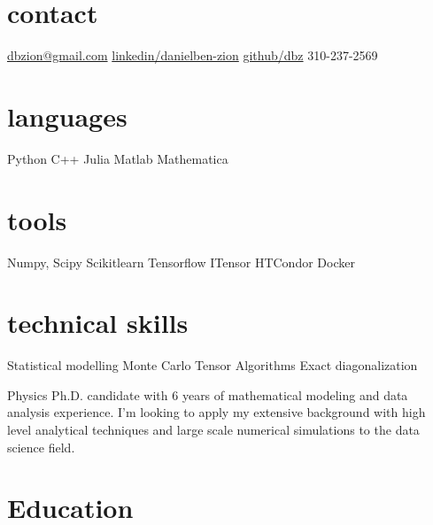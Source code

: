 \documentclass[]{friggeri-cv} %
\begin{document}


\begin{aside} %
\section{contact}
\href{mailto:dbzion@gmail.com}{dbzion@gmail.com}
\href{https://www.linkedin.com/in/daniel-ben-zion-80a070163/}{linkedin/danielben-zion}
\href{https://github.com/dbz10}{github/dbz}
310-237-2569
\section{languages}
Python
C++
Julia
Matlab
Mathematica
\section{tools}
Numpy, Scipy
Scikitlearn
Tensorflow
ITensor
HTCondor
Docker
\section{technical skills}
Statistical modelling
Monte Carlo
Tensor Algorithms
Exact diagonalization
\end{aside}

Physics Ph.D. candidate with 6 years of mathematical modeling and data analysis experience. I'm looking to apply my extensive background with high level analytical techniques and large scale numerical simulations to the data science field.
\section{Education}
\end{document}

